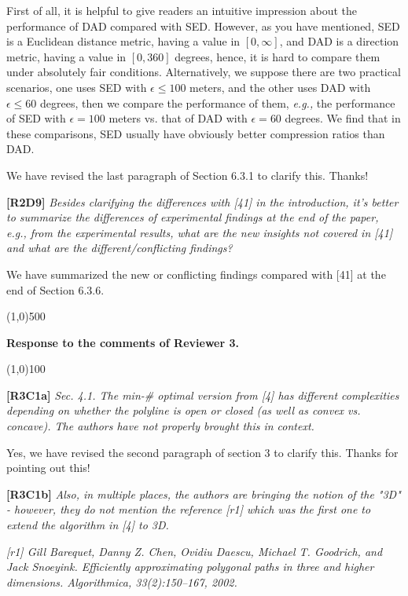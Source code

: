 \documentclass{letter}
\newcommand{\eg}{\emph{e.g.,}\xspace}
\begin{document}
{First of all, it is helpful to give readers an intuitive impression about the performance of DAD compared with SED. However, as you have mentioned, SED is a Euclidean distance metric, having a value in $[0, \infty]$, and DAD is a direction metric, having a value in $[0, 360]$ degrees, hence, it is hard to compare them under absolutely fair conditions. 
Alternatively, we suppose there are two practical scenarios, one uses SED with $\epsilon  \le  100$ meters, and the other uses DAD with $\epsilon \le 60$ degrees, then we compare the performance of them, \eg the performance of SED with $\epsilon=100$ meters vs. that of DAD with $\epsilon=60$ degrees. We find that in these comparisons, SED usually have obviously better compression ratios than DAD.

{We have revised the last paragraph of Section 6.3.1 to clarify this. Thanks!}

\textbf{[R2D9]} \emph{Besides clarifying the differences with [41] in the introduction, it’s better to summarize the differences of experimental findings at the end of the paper, e.g., from the experimental results, what are the new insights not covered in [41] and what are the different/conflicting findings?}

We have summarized the new or conflicting findings compared with [41] at the end of Section 6.3.6.


\line(1,0){500}

\textbf{Response to the comments of Reviewer 3.}

\line(1,0){100}

\textbf{[R3C1a]} \emph{
Sec. 4.1. The min-\# optimal version from [4] has different complexities depending on whether the polyline is open or closed (as well as convex vs. concave). The authors have not properly brought this in context.}

Yes, we have revised the second paragraph of section 3 to clarify this. Thanks for pointing out this!

\textbf{[R3C1b]} \emph{Also, in multiple places, the authors are bringing the notion of the "3D" - however, they do not mention the reference [r1] which was the first one to extend the algorithm in [4] to 3D. }

\emph{[r1] Gill Barequet, Danny Z. Chen, Ovidiu Daescu, Michael T. Goodrich, and Jack Snoeyink. Efficiently approximating polygonal paths in three and higher dimensions. Algorithmica, 33(2):150–167, 2002.}

}
\end{document}
